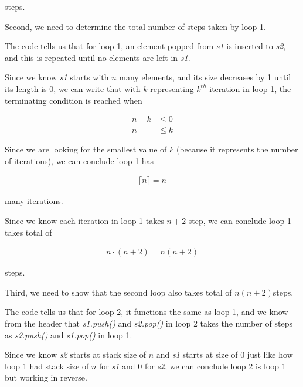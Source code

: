 \documentclass[12pt]{article}
\begin{document}
\begin{enumerate}[a.]
\begin{mdframed}
    steps.

    \bigskip

    Second, we need to determine the total number of steps taken by loop 1.

    \bigskip

    The code tells us that for loop 1, an element popped from \textit{s1} is inserted to \textit{s2},
    and this is repeated until no elements are left in \textit{s1}.

    \bigskip

    Since we know \textit{s1} starts with $n$ many elements, and its size decreases
    by 1 until its length is 0, we can write that with $k$ representing
    $k^{th}$ iteration in loop 1, the terminating condition is reached when

    \begin{align}
        n - k &\leq 0\\
        n &\leq k
    \end{align}

    \bigskip

    Since we are looking for the smallest value of $k$ (because it represents
    the number of iterations), we can conclude loop 1 has

    \begin{align}
        \lceil n \rceil = n
    \end{align}

    many iterations.

    \bigskip

    Since we know each iteration in loop 1 takes $n+2$ step, we can conclude
    loop 1 takes total of

    \begin{align}
        n \cdot (n+2) = n(n+2)
    \end{align}

    steps.

    \bigskip

    Third, we need to show that the second loop also takes total of \color{red}$n(n+2)$\color{black}\:steps.

    \bigskip
    \color{red}
    The code tells us that for loop 2, it functions the same as loop 1, and we
    know from the header that \textit{s1.push()} and \textit{s2.pop()} in loop 2
    takes the number of steps as \textit{s2.push()} and \textit{s1.pop()} in loop 1.

    \bigskip

    Since we know \textit{s2} starts at stack size of $n$ and \textit{s1} starts at size of 0
    just like how loop 1 had stack size of $n$ for \textit{s1} and
    0 for \textit{s2}, we can conclude loop 2 is loop 1 but working in reverse.


\end{mdframed}
\end{enumerate}
\end{document}
